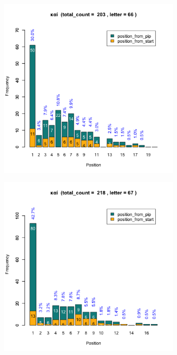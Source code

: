 \documentclass[a4paper]{article}
\begin{document}
\begin{figure}
\begin{subfigure}{0.45\textwidth}
\centering
\includegraphics[width=1\linewidth]{../../data/output/paul_R_par/plots/par3_lt66.png}
\end{subfigure}
\begin{subfigure}{0.45\textwidth}
\centering
\includegraphics[width=1\linewidth]{../../data/output/paul_R_par/plots/par3_lt67.png}

\end{subfigure}
\end{figure}
\end{document}
